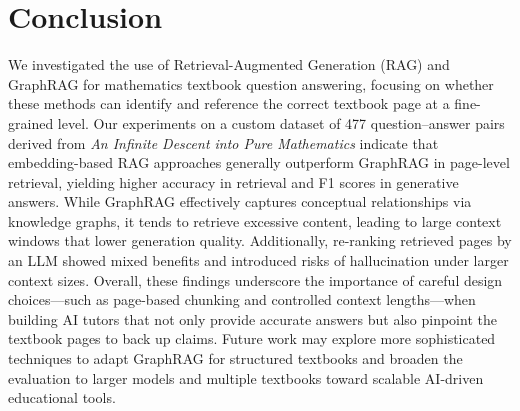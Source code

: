 \documentclass[runningheads]{llncs}
\begin{document}
\section{Conclusion}
We investigated the use of Retrieval-Augmented Generation (RAG) and GraphRAG for mathematics textbook question answering, focusing on whether these methods can identify and reference the correct textbook page at a fine-grained level. Our experiments on a custom dataset of 477 question–answer pairs derived from \emph{An Infinite Descent into Pure Mathematics} indicate that embedding-based RAG approaches generally outperform GraphRAG in page-level retrieval, yielding higher accuracy in retrieval and F1 scores in generative answers. While GraphRAG effectively captures conceptual relationships via knowledge graphs, it tends to retrieve excessive content, leading to large context windows that lower generation quality. Additionally, re-ranking retrieved pages by an LLM showed mixed benefits and introduced risks of hallucination under larger context sizes. Overall, these findings underscore the importance of careful design choices—such as page-based chunking and controlled context lengths—when building AI tutors that not only provide accurate answers but also pinpoint the textbook pages to back up claims. Future work may explore more sophisticated techniques to adapt GraphRAG for structured textbooks and broaden the evaluation to larger models and multiple textbooks toward scalable AI-driven educational tools.








\end{document}
